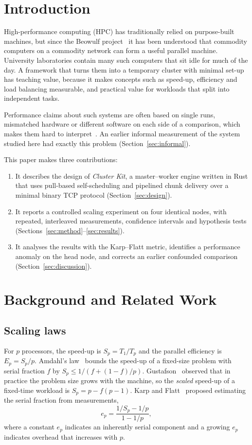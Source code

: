 \documentclass[conference,10pt]{IEEEtran}
\begin{document}
\section{Introduction}
High-performance computing (HPC) has traditionally relied on purpose-built machines, but since the Beowulf project~\cite{beowulf} it has been understood that commodity computers on a commodity network can form a useful parallel machine. University laboratories contain many such computers that sit idle for much of the day. A framework that turns them into a temporary cluster with minimal set-up has teaching value, because it makes concepts such as speed-up, efficiency and load balancing measurable, and practical value for workloads that split into independent tasks.

Performance claims about such systems are often based on single runs, mismatched hardware or different software on each side of a comparison, which makes them hard to interpret~\cite{hoefler}. An earlier informal measurement of the system studied here had exactly this problem (Section~\ref{sec:informal}).

This paper makes three contributions:
\begin{enumerate}
\item It describes the design of \emph{Cluster Kit}, a master--worker engine written in Rust that uses pull-based self-scheduling and pipelined chunk delivery over a minimal binary TCP protocol (Section~\ref{sec:design}).
\item It reports a controlled scaling experiment on four identical nodes, with repeated, interleaved measurements, confidence intervals and hypothesis tests (Sections~\ref{sec:method}--\ref{sec:results}).
\item It analyses the results with the Karp--Flatt metric, identifies a performance anomaly on the head node, and corrects an earlier confounded comparison (Section~\ref{sec:discussion}).
\end{enumerate}

\section{Background and Related Work}\label{sec:background}
\subsection{Scaling laws}
For $p$ processors, the speed-up is $S_p = T_1/T_p$ and the parallel efficiency is $E_p = S_p/p$. Amdahl's law~\cite{amdahl} bounds the speed-up of a fixed-size problem with serial fraction $f$ by $S_p \le 1/(f + (1-f)/p)$. Gustafson~\cite{gustafson} observed that in practice the problem size grows with the machine, so the \emph{scaled} speed-up of a fixed-time workload is $S_p = p - f(p-1)$. Karp and Flatt~\cite{karpflatt} proposed estimating the serial fraction from measurements,
\begin{equation}
e_p = \frac{1/S_p - 1/p}{1 - 1/p},
\label{eq:kf}
\end{equation}
where a constant $e_p$ indicates an inherently serial component and a growing $e_p$ indicates overhead that increases with $p$.
\end{document}
